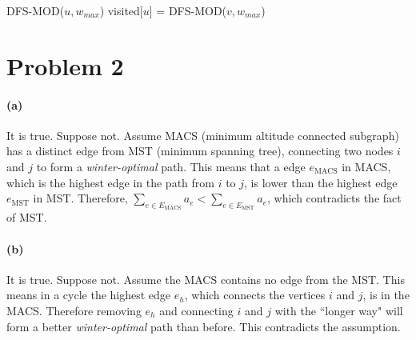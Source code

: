 \documentclass[letter,12pt]{article}
\begin{document}
\begin{algorithm}
\begin{algorithmic}
\STATE DFS-MOD($u, w_{max}$)
\STATE visited[$u$] = \TRUE
{}
\STATE DFS-MOD($v, w_{max}$)
\ENDIF
\ENDFOR
\end{algorithmic}
\end{algorithm}

\section*{Problem 2}
\paragraph*{(a)} It is true. Suppose not. Assume MACS (minimum 
altitude connected subgraph) has a distinct edge from MST (minimum 
spanning tree), connecting two nodes $i$ and $j$ to form a 
\textit{winter-optimal} path. This means that a edge $e_{\text{MACS}}$
in MACS, which is the highest edge in the path from $i$ to $j$, is 
lower than the highest edge $e_{\text{MST}}$ in MST. Therefore,
$\sum\limits_{e \in E_{\text{MACS}}}a_e < \sum\limits_{e \in 
 E_{\text{MST}}}a_e$, which contradicts the fact of MST.

%
%

\paragraph*{(b)}
It is true. Suppose not. Assume the MACS contains no edge from the 
MST. This means in a cycle the highest edge $e_h$, which connects
the vertices $i$ and $j$, is in the MACS. Therefore removing $e_h$ and 
connecting $i$ and $j$ with the ``longer way" will form a better 
\textit{winter-optimal} path than before. This contradicts the 
assumption.
\end{document}
